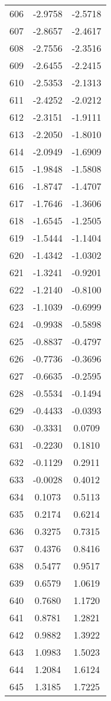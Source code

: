 \documentclass{article}
\begin{document}
\begin{longtable}{|c|c|c|}
606 & -2.9758 & -2.5718 \\
607 & -2.8657 & -2.4617 \\
608 & -2.7556 & -2.3516 \\
609 & -2.6455 & -2.2415 \\
610 & -2.5353 & -2.1313 \\
611 & -2.4252 & -2.0212 \\
612 & -2.3151 & -1.9111 \\
613 & -2.2050 & -1.8010 \\
614 & -2.0949 & -1.6909 \\
615 & -1.9848 & -1.5808 \\
616 & -1.8747 & -1.4707 \\
617 & -1.7646 & -1.3606 \\
618 & -1.6545 & -1.2505 \\
619 & -1.5444 & -1.1404 \\
620 & -1.4342 & -1.0302 \\
621 & -1.3241 & -0.9201 \\
622 & -1.2140 & -0.8100 \\
623 & -1.1039 & -0.6999 \\
624 & -0.9938 & -0.5898 \\
625 & -0.8837 & -0.4797 \\
626 & -0.7736 & -0.3696 \\
627 & -0.6635 & -0.2595 \\
628 & -0.5534 & -0.1494 \\
629 & -0.4433 & -0.0393 \\
630 & -0.3331 & 0.0709 \\
631 & -0.2230 & 0.1810 \\
632 & -0.1129 & 0.2911 \\
633 & -0.0028 & 0.4012 \\
634 & 0.1073 & 0.5113 \\
635 & 0.2174 & 0.6214 \\
636 & 0.3275 & 0.7315 \\
637 & 0.4376 & 0.8416 \\
638 & 0.5477 & 0.9517 \\
639 & 0.6579 & 1.0619 \\
640 & 0.7680 & 1.1720 \\
641 & 0.8781 & 1.2821 \\
642 & 0.9882 & 1.3922 \\
643 & 1.0983 & 1.5023 \\
644 & 1.2084 & 1.6124 \\
645 & 1.3185 & 1.7225 \\

\end{longtable}
\end{document}
